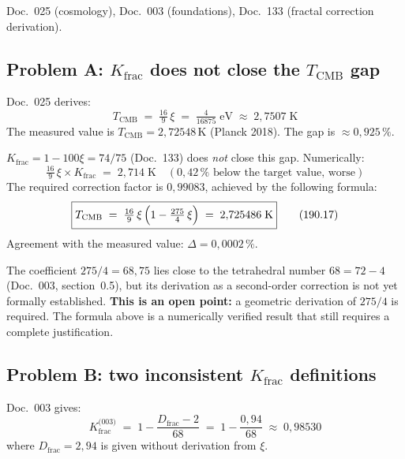 Doc.~025 (cosmology), Doc.~003 (foundations), Doc.~133 (fractal correction derivation).

\subsection*{Problem A: $K_\text{frac}$ does not close the $T_\text{CMB}$ gap}

Doc.~025 derives:
\begin{equation}
  T_\text{CMB} \;=\; \tfrac{16}{9}\,\xi \;=\; \tfrac{4}{16875}\;\text{eV}
  \;\approx\; 2{,}7507\;\text{K}
  \tag{190.15}
\end{equation}
The measured value is $T_\text{CMB} = 2{,}72548\,\text{K}$ (Planck 2018). The
gap is $\approx 0{,}925\,\%$.

$K_\text{frac} = 1 - 100\xi = 74/75$ (Doc.~133) does \emph{not} close this gap.
Numerically:
\begin{equation}
  \tfrac{16}{9}\,\xi \times K_\text{frac} \;=\; 2{,}714\;\text{K}
  \quad (0{,}42\,\% \text{ below the target value, worse})
  \tag{190.16}
\end{equation}
The required correction factor is $0{,}99083$, achieved by the following
formula:
\begin{equation}
  \boxed{
    T_\text{CMB} \;=\; \tfrac{16}{9}\,\xi\,\Bigl(1 - \tfrac{275}{4}\,\xi\Bigr)
    \;=\; 2{,}725486\;\text{K}
  }
  \tag{190.17}
\end{equation}
Agreement with the measured value: $\Delta = 0{,}0002\,\%$.

The coefficient $275/4 = 68{,}75$ lies close to the tetrahedral number
$68 = 72 - 4$ (Doc.~003, section~0.5), but its derivation as a second-order
correction is not yet formally established. \textbf{This is an open point:} a
geometric derivation of $275/4$ is required. The formula above is a numerically
verified result that still requires a complete justification.

\subsection*{Problem B: two inconsistent $K_\text{frac}$ definitions}

Doc.~003 gives:
\begin{equation}
  K_\text{frac}^\text{(003)} \;=\; 1 - \frac{D_\text{frac} - 2}{68}
  \;=\; 1 - \frac{0{,}94}{68} \;\approx\; 0{,}98530
  \tag{190.18}
\end{equation}
where $D_\text{frac} = 2{,}94$ is given without derivation from $\xi$.

